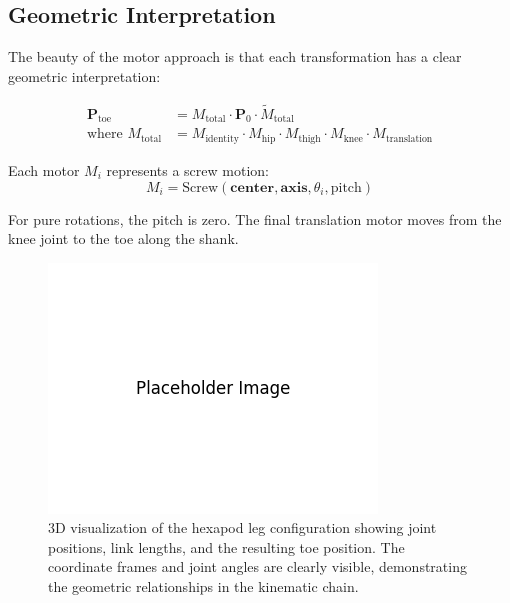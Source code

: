 \documentclass[11pt]{article}
\begin{document}
\subsection{Geometric Interpretation}

The beauty of the motor approach is that each transformation has a clear geometric interpretation:

\begin{align}
\mathbf{P}_{\text{toe}} &= M_{\text{total}} \cdot \mathbf{P}_0 \cdot \tilde{M}_{\text{total}}\\
\text{where } M_{\text{total}} &= M_{\text{identity}} \cdot M_{\text{hip}} \cdot M_{\text{thigh}} \cdot M_{\text{knee}} \cdot M_{\text{translation}}
\end{align}

Each motor $M_i$ represents a screw motion:
\[M_i = \text{Screw}(\mathbf{center}, \mathbf{axis}, \theta_i, \text{pitch})\]

For pure rotations, the pitch is zero. The final translation motor moves from the knee joint to the toe along the shank.

\begin{figure}[H]
    \centering
    \includegraphics[width=\textwidth]{illustrations/leg_configuration-py.png}
    \caption{3D visualization of the hexapod leg configuration showing joint positions, link lengths, and the resulting toe position. The coordinate frames and joint angles are clearly visible, demonstrating the geometric relationships in the kinematic chain.}
    \label{fig:leg_config}
\end{figure}
\end{document}
